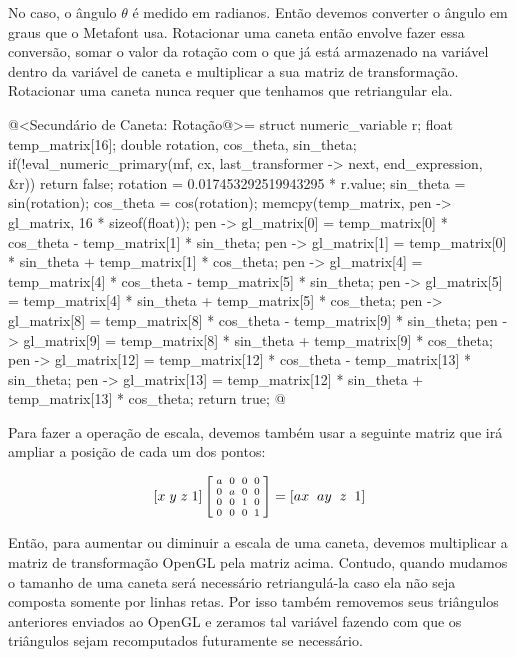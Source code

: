 {No caso, o ângulo $\theta$ é medido em radianos. Então devemos
converter o ângulo em graus que o Metafont usa. Rotacionar uma caneta
então envolve fazer essa conversão, somar o valor da rotação com o que
já está armazenado na variável  dentro da
variável de caneta e multiplicar a sua matriz de
transformação. Rotacionar uma caneta nunca requer que tenhamos que
retriangular ela.

\iniciocodigo
@<Secundário de Caneta: Rotação@>=
struct numeric_variable r;
float temp_matrix[16];
double rotation, cos_theta, sin_theta;
if(!eval_numeric_primary(mf, cx, last_transformer -> next, end_expression, &r))
  return false;
rotation = 0.017453292519943295 * r.value;
sin_theta = sin(rotation);
cos_theta = cos(rotation);
memcpy(temp_matrix, pen -> gl_matrix, 16 * sizeof(float));
pen -> gl_matrix[0] = temp_matrix[0] * cos_theta - temp_matrix[1] * sin_theta;
pen -> gl_matrix[1] = temp_matrix[0] * sin_theta + temp_matrix[1] * cos_theta;
pen -> gl_matrix[4] = temp_matrix[4] * cos_theta - temp_matrix[5] * sin_theta;
pen -> gl_matrix[5] = temp_matrix[4] * sin_theta + temp_matrix[5] * cos_theta;
pen -> gl_matrix[8] = temp_matrix[8] * cos_theta - temp_matrix[9] * sin_theta;
pen -> gl_matrix[9] = temp_matrix[8] * sin_theta + temp_matrix[9] * cos_theta;
pen -> gl_matrix[12] = temp_matrix[12] * cos_theta - temp_matrix[13] * sin_theta;
pen -> gl_matrix[13] = temp_matrix[12] * sin_theta + temp_matrix[13] * cos_theta;
return true;
@
\fimcodigo

Para fazer a operação de escala, devemos também usar a seguinte matriz
que irá ampliar a posição de cada um dos pontos:

$$\left[x\; y\; z\; 1\right]\left[{{a \atop 0}\atop {0\atop
      0}}{{0 \atop a}\atop {0 \atop 0}}{{0\atop 0}\atop{1 \atop
      0}}{{0 \atop 0}\atop{0\atop 1}}\right]=\left[ax \;\; ay\;\;
      z\;\; 1\right]
$$

Então, para aumentar ou diminuir a escala de uma caneta, devemos
multiplicar a matriz de transformação OpenGL pela matriz
acima. Contudo, quando mudamos o tamanho de uma caneta será necessário
retriangulá-la caso ela não seja composta somente por linhas
retas. Por isso também removemos seus triângulos anteriores enviados
ao OpenGL e zeramos tal variável fazendo com que os triângulos sejam
recomputados futuramente se necessário.

}
